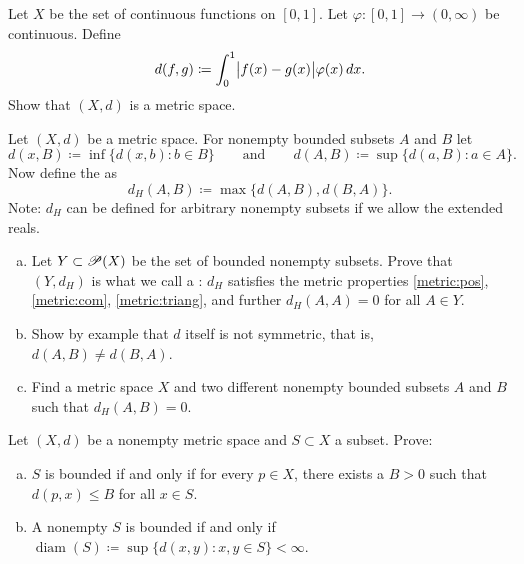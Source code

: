 \begin{exercise}
Let $X$ be the set of continuous functions on $[0,1]$.  Let $\varphi \colon
[0,1] \to (0,\infty)$ be continuous.  Define
\begin{equation*}
d(f,g) \coloneqq \int_0^1 \bigl\lvert {f(x)-g(x)} \bigr\rvert\varphi(x)\,dx .
\end{equation*}
Show that $(X,d)$ is a metric space.
\end{exercise}

\begin{exercise} \label{exercise:mshausdorffpseudo}
Let $(X,d)$ be a metric space.  For nonempty bounded subsets $A$ and $B$ let
\begin{equation*}
d(x,B) \coloneqq \inf \bigl\{ d(x,b) : b \in B \bigr\}
\qquad \text{and} \qquad
d(A,B) \coloneqq \sup \bigl\{ d(a,B) : a \in A \bigr\} .
\end{equation*}
Now define the \emph{} as
\begin{equation*}
d_H(A,B) \coloneqq \max \bigl\{ d(A,B) , d(B,A) \bigr\} .
\end{equation*}
Note: $d_H$ can be defined for arbitrary nonempty subsets if we allow the
extended reals.
\begin{enumerate}[a)]
\item
Let $Y \subset {\mathscr{P}}(X)$ be the set of bounded nonempty subsets.
Prove that
$(Y,d_H)$ is what we call a \emph{}:
$d_H$ satisfies the metric properties
\ref{metric:pos},
\ref{metric:com}, 
\ref{metric:triang}, and further
$d_H(A,A) = 0$ for all $A \in Y$. 
\item
Show by example that $d$ itself is not symmetric,
that is, $d(A,B) \neq d(B,A)$.
\item
Find a metric space $X$ and two different
nonempty bounded subsets $A$ and $B$ such that $d_H(A,B) = 0$.
\end{enumerate}
\end{exercise}

\begin{exercise}
Let $(X,d)$ be a nonempty metric space and $S \subset X$ a subset.  Prove:
\begin{enumerate}[a)]
\item
$S$ is bounded if and only if
for every $p \in X$, there exists a $B > 0$ such that $d(p,x) \leq B$ for
all $x \in S$.
\item
A nonempty $S$ is bounded if and only if
$\operatorname{diam}(S) \coloneqq \sup \{ d(x,y) : x,y \in S \} < \infty$.
\end{enumerate}
\end{exercise}

